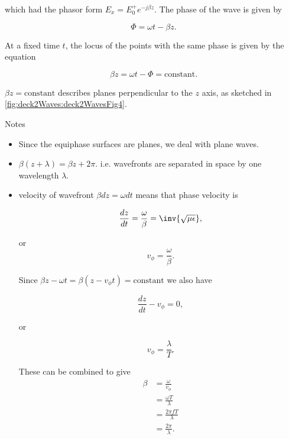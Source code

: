 which had the phasor form \( E_x = E_0^{+} e^{-j \beta z} \).  The phase of the wave is given by

\begin{equation}\label{eqn:uwavesLecture2:1060}
\Phi = \omega t - \beta z.
\end{equation}

At a fixed time \( t \), the locus of the points with the same phase is given by the equation

\begin{equation}\label{eqn:uwavesLecture2:1080}
\beta z = \omega t - \Phi = \textrm{constant}.
\end{equation}

\( \beta z = \textrm{constant} \) describes planes perpendicular to the \( z \) axis, as sketched in \cref{fig:deck2Waves:deck2WavesFig4}.


Notes

\begin{itemize}
\item Since the equiphase surfaces are planes, we deal with plane waves.
\item \( \beta( z + \lambda ) = \beta z + 2 \pi \).  i.e. wavefronts are separated in space by one wavelength \( \lambda \).
\item velocity of wavefront \( \beta dz = \omega dt \) means that phase velocity is

\begin{equation}\label{eqn:uwavesLecture2:1100}
\frac{dz}{dt} = \frac{\omega}{\beta} = \inv{\sqrt{\mu \epsilon} },
\end{equation}

or
\begin{equation}\label{eqn:uwavesDeck2WaveEquationCore:1500}
v_\phi = \frac{\omega}{\beta}.
\end{equation}

Since \( \beta z - \omega t = \beta ( z - v_\phi t ) = \textrm{constant} \) we also have

\begin{equation}\label{eqn:uwavesDeck2WaveEquationCore:1520}
\frac{dz}{dt} - v_\phi = 0,
\end{equation}

or

\begin{equation}\label{eqn:uwavesDeck2WaveEquationCore:1540}
v_\phi = \frac{\lambda}{T}.
\end{equation}

These can be combined to give
\begin{equation}\label{eqn:uwavesDeck2WaveEquationCore:1560}
\begin{aligned}
\beta
&= \frac{\omega}{v_\phi}
\\ &= \frac{\omega T}{\lambda}
\\ &= \frac{2 \pi f T}{\lambda}
\\ &= \frac{2 \pi}{\lambda}.
\end{aligned}
\end{equation}

\end{itemize}

